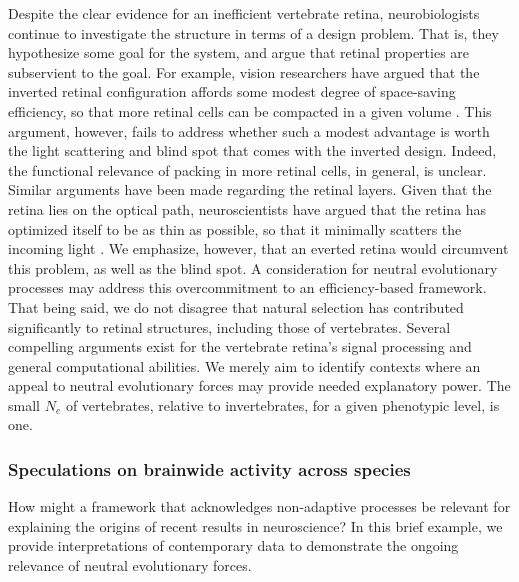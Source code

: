 \documentclass[twocolumn]{article}
\begin{document}
Despite the clear evidence for an inefficient vertebrate retina, neurobiologists continue to investigate the structure in terms of a design problem. That is, they hypothesize some goal for the system, and argue that retinal properties are subservient to the goal. For example, vision researchers have argued that the inverted retinal configuration affords some modest degree of space-saving efficiency, so that more retinal cells can be compacted in a given volume \cite{kroger_2009}. This argument, however, fails to address whether such a modest advantage is worth the light scattering and blind spot that comes with the inverted design. Indeed, the functional relevance of packing in more retinal cells, in general, is unclear. Similar arguments have been made regarding the retinal layers. Given that the retina lies on the optical path, neuroscientists have argued that the retina has optimized itself to be as thin as possible, so that it minimally scatters the incoming light \cite{sterling_laughlin_principles}. We emphasize, however, that an everted retina would circumvent this problem, as well as the blind spot. A consideration for neutral evolutionary processes may address this overcommitment to an efficiency-based framework. That being said, we do not disagree that natural selection has contributed significantly to retinal structures, including those of vertebrates. Several compelling arguments exist for the vertebrate retina's signal processing and general computational abilities. We merely aim to identify contexts where an appeal to neutral evolutionary forces may provide needed explanatory power. The small $N_e$ of vertebrates, relative to invertebrates, for a given phenotypic level, is one. 

\subsubsection{Speculations on brainwide activity across species}
How might a framework that acknowledges non-adaptive processes be relevant for explaining the origins of recent results in neuroscience? In this brief example, we provide interpretations of contemporary data to demonstrate the ongoing relevance of neutral evolutionary forces. 
\end{document}
